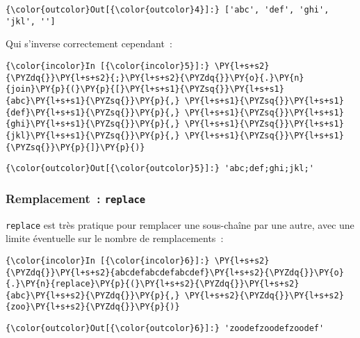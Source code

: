 \begin{Verbatim}[commandchars=\\\{\}]
{\color{outcolor}Out[{\color{outcolor}4}]:} ['abc', 'def', 'ghi', 'jkl', '']
\end{Verbatim}
            
    Qui s'inverse correctement cependant~:

    \begin{Verbatim}[commandchars=\\\{\}]
{\color{incolor}In [{\color{incolor}5}]:} \PY{l+s+s2}{\PYZdq{}}\PY{l+s+s2}{;}\PY{l+s+s2}{\PYZdq{}}\PY{o}{.}\PY{n}{join}\PY{p}{(}\PY{p}{[}\PY{l+s+s1}{\PYZsq{}}\PY{l+s+s1}{abc}\PY{l+s+s1}{\PYZsq{}}\PY{p}{,} \PY{l+s+s1}{\PYZsq{}}\PY{l+s+s1}{def}\PY{l+s+s1}{\PYZsq{}}\PY{p}{,} \PY{l+s+s1}{\PYZsq{}}\PY{l+s+s1}{ghi}\PY{l+s+s1}{\PYZsq{}}\PY{p}{,} \PY{l+s+s1}{\PYZsq{}}\PY{l+s+s1}{jkl}\PY{l+s+s1}{\PYZsq{}}\PY{p}{,} \PY{l+s+s1}{\PYZsq{}}\PY{l+s+s1}{\PYZsq{}}\PY{p}{]}\PY{p}{)}
\end{Verbatim}


\begin{Verbatim}[commandchars=\\\{\}]
{\color{outcolor}Out[{\color{outcolor}5}]:} 'abc;def;ghi;jkl;'
\end{Verbatim}
            
    \hypertarget{remplacement-replace}{%
\subsubsection{\texorpdfstring{Remplacement~:
\texttt{replace}}{Remplacement~: replace}}\label{remplacement-replace}}

    \texttt{replace} est très pratique pour remplacer une sous-chaîne par
une autre, avec une limite éventuelle sur le nombre de remplacements~:

    \begin{Verbatim}[commandchars=\\\{\}]
{\color{incolor}In [{\color{incolor}6}]:} \PY{l+s+s2}{\PYZdq{}}\PY{l+s+s2}{abcdefabcdefabcdef}\PY{l+s+s2}{\PYZdq{}}\PY{o}{.}\PY{n}{replace}\PY{p}{(}\PY{l+s+s2}{\PYZdq{}}\PY{l+s+s2}{abc}\PY{l+s+s2}{\PYZdq{}}\PY{p}{,} \PY{l+s+s2}{\PYZdq{}}\PY{l+s+s2}{zoo}\PY{l+s+s2}{\PYZdq{}}\PY{p}{)}
\end{Verbatim}


\begin{Verbatim}[commandchars=\\\{\}]
{\color{outcolor}Out[{\color{outcolor}6}]:} 'zoodefzoodefzoodef'
\end{Verbatim}
            
